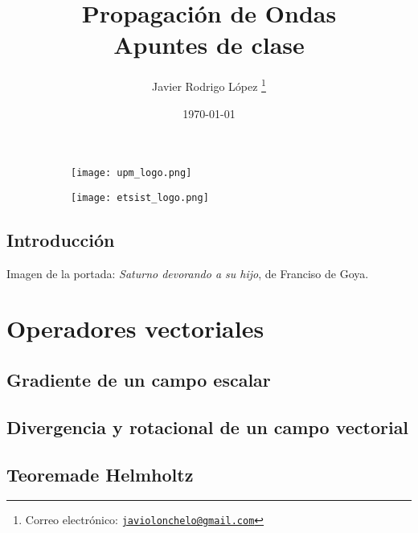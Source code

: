 \documentclass[a4paper]{book}
\title{\Huge Propagación de Ondas\\\vspace*{5pt}
\Large Apuntes de clase}
\author{Javier Rodrigo López \thanks{Correo electrónico: \href{mailto:javiolonchelo@gmail.com}{\texttt{javiolonchelo@gmail.com}}}}
\date{\today}
\begin{document}
\setlength{\wpYoffset}{-2 cm}
\maketitle


\begin{figure}[t!]
\centering
	\begin{subfigure}[b]{0.65\linewidth}
		\texttt{[image: upm\_logo.png]}
	\end{subfigure}
	\begin{subfigure}[b]{0.25\linewidth}
		\texttt{[image: etsist\_logo.png]}
	\end{subfigure}
\end{figure}

\newpage
{}
{}
\section*{Introducción}
Imagen de la portada: \textsl{Saturno devorando a su hijo}, de Franciso de Goya.
\newpage

\setlength{\parskip}{0em}
\tableofcontents 
\setlength{\parskip}{0.5em}

\chapter{Operadores vectoriales}
\section{Gradiente de un campo escalar}
\section{Divergencia y rotacional de un campo vectorial}
\section{Teoremade Helmholtz}
\end{document}
